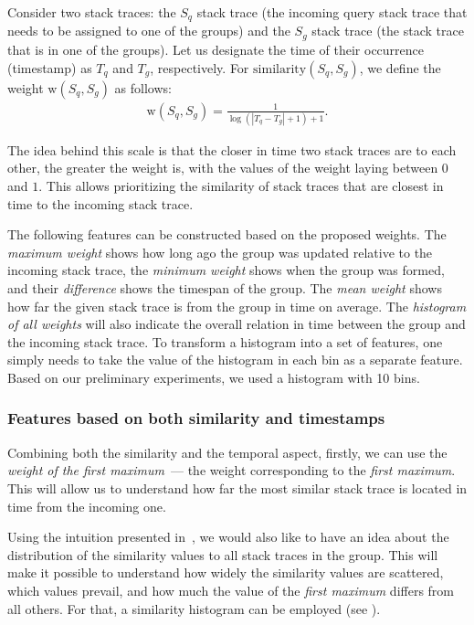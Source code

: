 Consider two stack traces: the $S_q$ stack trace (the incoming query stack trace that needs to be assigned to one of the groups) and the $S_g$ stack trace (the stack trace that is in one of the groups). Let us designate the time of their occurrence (timestamp) as $T_q$ and $T_g$, respectively.
For $\mathrm{similarity}(S_q, S_g)$, we define the weight $\mathrm{w}(S_q, S_g)$ as follows:
\begin{gather}
    \label{eq:weight}
    \mathrm{w}(S_q, S_g) = \frac{1}{\log(|T_q - T_g| + 1) + 1}.
\end{gather}

The idea behind this scale is that the closer in time two stack traces are to each other, the greater the weight is, with the values of the weight laying between $0$ and $1$. This allows prioritizing the similarity of stack traces that are closest in time to the incoming stack trace.

The following features can be constructed based on the proposed weights. The \textit{maximum weight} shows how long ago the group was updated relative to the incoming stack trace, the \textit{minimum weight} shows when the group was formed, and their \textit{difference} shows the timespan of the group. The \textit{mean weight} shows how far the given stack trace is from the group in time on average. The \textit{histogram of all weights} will also indicate the overall relation in time between the group and the incoming stack trace. To transform a histogram into a set of features, one simply needs to take the value of the histogram in each bin as a separate feature. Based on our preliminary experiments, we used a histogram with 10 bins.

\subsubsection{Features based on both similarity and timestamps}

Combining both the similarity and the temporal aspect, firstly, we can use the \textit{weight of the first maximum}~--- the weight corresponding to the \textit{first maximum}. This will allow us to understand how far the most similar stack trace is located in time from the incoming one.

Using the intuition presented in~, we would also like to have an idea about the distribution of the similarity values to all stack traces in the group.
This will make it possible to understand how widely the similarity values are scattered, which values prevail, and how much the value of the \textit{first maximum} differs from all others. For that, a similarity histogram can be employed (see ).

